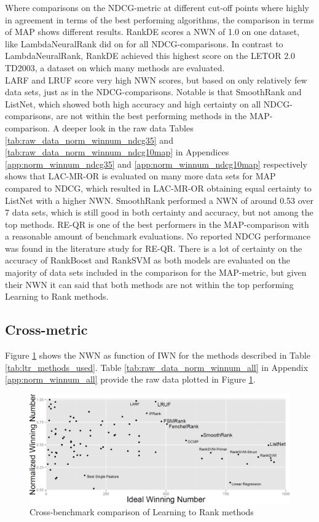 Where comparisons on the \ac{NDCG}-metric at different cut-off points where highly in agreement in terms of the best performing algorithms, the comparison in terms of \ac{MAP} shows different results. RankDE scores a \ac{NWN} of 1.0 on one dataset, like LambdaNeuralRank did on for all \ac{NDCG}-comparisons. In contrast to LambdaNeuralRank, RankDE achieved this highest score on the LETOR 2.0 TD2003, a dataset on which many methods are evaluated.\\

LARF and LRUF score very high \ac{NWN} scores, but based on only relatively few data sets, just as in the \ac{NDCG}-comparisons. Notable is that SmoothRank and ListNet, which showed both high accuracy and high certainty on all \ac{NDCG}-comparisons, are not within the best performing methods in the \ac{MAP}-comparison. A deeper look in the raw data Tables \ref{tab:raw_data_norm_winnum_ndcg35} and \ref{tab:raw_data_norm_winnum_ndcg10map} in Appendices \ref{app:norm_winnum_ndcg35} and \ref{app:norm_winnum_ndcg10map} respectively shows that LAC-MR-OR is evaluated on many more data sets for \ac{MAP} compared to \ac{NDCG}, which resulted in LAC-MR-OR obtaining equal certainty to ListNet with a higher \ac{NWN}. SmoothRank performed a \ac{NWN} of around 0.53 over 7 data sets, which is still good in both certainty and accuracy, but not among the top methods. RE-QR is one of the best performers in the \ac{MAP}-comparison with a reasonable amount of benchmark evaluations. No reported \ac{NDCG} performance was found in the literature study for RE-QR. There is a lot of certainty on the accuracy of RankBoost and Rank\acs{SVM} as both models are evaluated on the majority of data sets included in the comparison for the \ac{MAP}-metric, but given their \ac{NWN} it can said that both methods are not within the top performing Learning to Rank methods.

\subsection{Cross-metric}
Figure \ref{fig:normalised_winning_number_all} shows the \ac{NWN} as function of \ac{IWN} for the methods described in Table \ref{tab:ltr_methods_used}. Table \ref{tab:raw_data_norm_winnum_all} in Appendix \ref{app:norm_winnum_all} provide the raw data plotted in Figure \ref{fig:normalised_winning_number_all}.\\

\begin{figure}[!h]
\centering
\includegraphics[scale=0.38]{gfx/combined_normalized_winnum}
\caption{Cross-benchmark comparison of Learning to Rank methods}
\label{fig:normalised_winning_number_all}
\end{figure}

